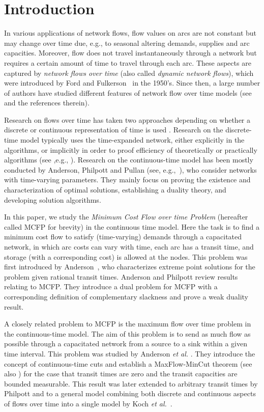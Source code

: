 \documentclass{svjour3}                     \smartqed
\begin{document}
\section{Introduction}
In various applications of network flows, flow values on arcs are not constant but may change over time due, e.g., to seasonal altering demands, supplies and arc capacities. Moreover, flow does not travel instantaneously through a network but requires a certain amount of time to travel through each arc. These aspects are captured by \emph{network flows over time} (also called \emph{dynamic network flows}), which were introduced by Ford and Fulkerson~\cite{FordFulkerson58,FordFulkerson62} in the 1950's. Since then, a large number of authors have studied different features of network flow over time models (see \cite{Skutella-Korte09} and the references therein). 


Research on flows over time has taken two approaches depending on whether a discrete or continuous representation of time is used \cite{FleischerTardos98}. Research on the discrete-time model typically uses the time-expanded network, either explicitly in the algorithms, or implicitly in order to proof efficiency of theoretically or practically algorithms (see ,e.g., \cite{FleischerSkut-SICOMP}). Research on the continuous-time model has been mostly conducted by Anderson, Philpott and Pullan (see, e.g.,~\cite{Anderson89,AndersonPhilpott89,AndersonPhilpott94,Philpott82,Philpott90,Pullan93,Pullan97}), who consider networks with time-varying parameters. They mainly focus on proving the existence and characterization of optimal solutions, establishing a duality theory, and developing solution algorithms. 

In this paper, we study the \emph{Minimum Cost Flow over time Problem} (hereafter called MCFP for brevity) in the continuous time model. Here the task is to find a minimum cost flow to satisfy (time-varying) demands through a capacitated network, in which arc costs can vary with time, each arc has a transit time, and storage (with a corresponding cost) is allowed at the nodes.  This problem was first introduced by Anderson~\cite{Anderson89}, who characterizes extreme point solutions for the problem given rational transit times. Anderson and Philpott \cite{AndersonPhilpott94} review results relating to MCFP. They introduce a dual problem for MCFP with a corresponding definition of complementary slackness and prove a weak duality result.


A closely related problem to MCFP is the maximum flow over time problem in the continuous-time model. The aim of this problem is to send as much flow as possible  through a capacitated network from a source to a sink within a given time interval. This problem was studied by Anderson \emph{et al.} \cite{AndersonNashPhilpott82}. They introduce the concept of continuous-time cuts and establish a MaxFlow-MinCut theorem (see also \cite{AndersonNash87}) for the case that transit times are zero and the transit capacities are bounded measurable. This result was later extended to arbitrary transit times by Philpott \cite{Philpott90} and to a general model combining both discrete and continuous aspects of flows over time into a single model by Koch \emph{et al.}~\cite{KochNasrSkut11}.
\end{document}

